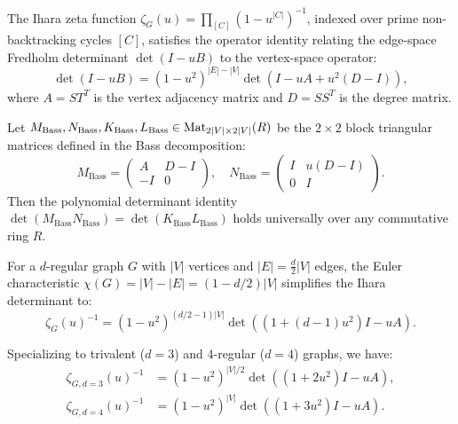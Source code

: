 \begin{theorem}
\label{thm:ihara_zeta_inv}
\leanok
The Ihara zeta function $\zeta_G(u) = \prod_{[C]} (1 - u^{|C|})^{-1}$, indexed over prime non-backtracking cycles $[C]$, satisfies the operator identity relating the edge-space Fredholm determinant $\det(I - u B)$ to the vertex-space operator:
\[
\det(I - u B) = (1 - u^2)^{|E| - |V|} \det(I - u A + u^2 (D - I)),
\]
where $A = S T^T$ is the vertex adjacency matrix and $D = S S^T$ is the degree matrix.
\end{theorem}

\begin{theorem}
\label{thm:ihara_bass_polynomial}
\leanok
Let $M_{\mathrm{Bass}}, N_{\mathrm{Bass}}, K_{\mathrm{Bass}}, L_{\mathrm{Bass}} \in \mathrm{Mat}_{2|V| \times 2|V|}(R)$ be the $2 \times 2$ block triangular matrices defined in the Bass decomposition:
\[
M_{\mathrm{Bass}} = \begin{pmatrix} A & D - I \\ -I & 0 \end{pmatrix}, \quad 
N_{\mathrm{Bass}} = \begin{pmatrix} I & u(D - I) \\ 0 & I \end{pmatrix}.
\]
Then the polynomial determinant identity $\det(M_{\mathrm{Bass}} N_{\mathrm{Bass}}) = \det(K_{\mathrm{Bass}} L_{\mathrm{Bass}})$ holds universally over any commutative ring $R$.
\end{theorem}

\begin{theorem}
\label{thm:ihara_bass_regular}
\leanok
For a $d$-regular graph $G$ with $|V|$ vertices and $|E| = \frac{d}{2}|V|$ edges, the Euler characteristic $\chi(G) = |V| - |E| = (1 - d/2)|V|$ simplifies the Ihara determinant to:
\[
\zeta_G(u)^{-1} = (1 - u^2)^{(d/2 - 1)|V|} \det\left((1 + (d - 1)u^2) I - u A\right).
\]
\end{theorem}

\begin{theorem}
\label{thm:ihara_bass_trivalent_and_4regular}
\leanok
Specializing to trivalent ($d=3$) and 4-regular ($d=4$) graphs, we have:
\begin{align*}
\zeta_{G, d=3}(u)^{-1} &= (1 - u^2)^{|V|/2} \det((1 + 2u^2)I - u A), \\
\zeta_{G, d=4}(u)^{-1} &= (1 - u^2)^{|V|} \det((1 + 3u^2)I - u A).
\end{align*}
\end{theorem}

